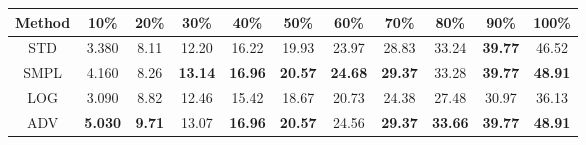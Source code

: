 \documentclass{standalone}
\begin{document}
\begin{tabular}{c|cccccccccc}
      \toprule
      Method & 10\% & 20\% & 30\% & 40\% & 50\% & 60\% & 70\% & 80\% & 90\% & 100\% \\
      \midrule
STD & 3.380 & 8.11 & 12.20 & 16.22 & 19.93 & 23.97 & 28.83 & 33.24 & \textbf{39.77} & 46.52\\
SMPL & 4.160 & 8.26 & \textbf{13.14} & \textbf{16.96} & \textbf{20.57} & \textbf{24.68} & \textbf{29.37} & 33.28 & \textbf{39.77} & \textbf{48.91}\\
LOG & 3.090 & 8.82 & 12.46 & 15.42 & 18.67 & 20.73 & 24.38 & 27.48 & 30.97 & 36.13\\
ADV & \textbf{5.030} & \textbf{9.71} & 13.07 & \textbf{16.96} & \textbf{20.57} & 24.56 & \textbf{29.37} & \textbf{33.66} & \textbf{39.77} & \textbf{48.91}\\
  \bottomrule
\end{tabular}
\end{document}
